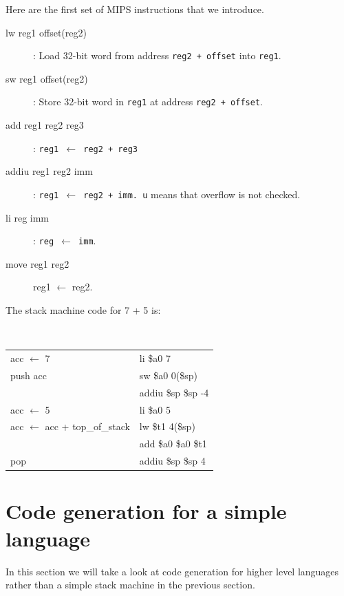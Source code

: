 Here are the first set of MIPS instructions that we introduce.
\begin{description}
\item[lw reg1 offset(reg2)]: Load 32-bit word from address \texttt{reg2 + offset} into \texttt{reg1}. 
\item[sw reg1 offset(reg2)]: Store 32-bit word in \texttt{reg1} at address \texttt{reg2 + offset}.
\item[add reg1 reg2 reg3]: \texttt{reg1 $\leftarrow$ reg2 + reg3}
\item[addiu reg1 reg2 imm]: \texttt{reg1 $\leftarrow$ reg2 + imm. u} means that overflow is not checked.
\item[li reg imm]: \texttt{reg $\leftarrow$ imm}.
\item[move reg1 reg2] reg1 $\leftarrow$ reg2.
\end{description}
The stack machine code for 7 + 5 is: 
\begin{table}[h]
\tt 
\centering
\begin{tabular}{ll}
acc $\leftarrow$ 7  & li \$a0 7 \\
push acc 			& sw \$a0 0(\$sp)\\
					& addiu \$sp \$sp -4 \\
acc $\leftarrow$ 5  & li \$a0 5 \\
acc $\leftarrow$ acc + top\_of\_stack & lw \$t1 4(\$sp) \\
									  & add \$a0 \$a0 \$t1 \\
pop & addiu \$sp \$sp 4
\end{tabular}
\end{table}
\section{Code generation for a simple language}
In this section we will take a look at code generation for higher level languages rather than a simple stack machine in the previous section.

